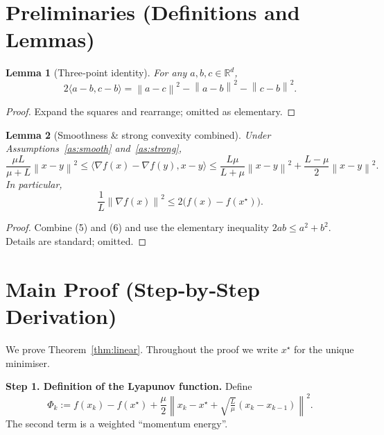 \documentclass{article}
\newtheorem{lemma}{Lemma}
\newcommand{\grad}{\nabla}
\newcommand{\R}{\mathbb{R}}
\newcommand{\norm}[1]{\left\|#1\right\|}
\newcommand{\ip}[2]{\langle #1,#2\rangle}
\begin{document}
\section*{Preliminaries (Definitions and Lemmas)}
\begin{lemma}[Three‑point identity]\label{lem:three}
For any $a,b,c\in\R^{d}$,
\[
2\ip{a-b}{c-b}= \norm{a-c}^{2}-\norm{a-b}^{2}-\norm{c-b}^{2}. \tag{11}
\]
\end{lemma}
\begin{proof}
Expand the squares and rearrange; omitted as elementary. \qedhere
\end{proof}
\begin{lemma}[Smoothness \& strong convexity combined]\label{lem:sc-smooth}
Under Assumptions~\ref{as:smooth} and~\ref{as:strong},
\[
\frac{\mu L}{\mu+L}\norm{x-y}^{2}\le
\ip{\grad f(x)-\grad f(y)}{x-y}\le
\frac{L\mu}{L+\mu}\norm{x-y}^{2}+\frac{L-\mu}{2}\norm{x-y}^{2}. \tag{12}
\]
In particular,
\[
\frac{1}{L}\norm{\grad f(x)}^{2}\le 2\bigl(f(x)-f(x^{\star})\bigr). \tag{13}
\]
\end{lemma}
\begin{proof}
Combine (5) and (6) and use the elementary inequality
$2ab\le a^{2}+b^{2}$.  Details are standard; omitted. \qedhere
\end{proof}
\section*{Main Proof (Step‑by‑Step Derivation)}
We prove Theorem~\ref{thm:linear}.  Throughout the proof we write $x^{\star}$ for the unique minimiser.

\noindent\textbf{Step 1. Definition of the Lyapunov function.}  
Define
\[
\Phi_{k}:=f(x_{k})-f(x^{\star})+\frac{\mu}{2}\norm{x_{k}-x^{\star}+\sqrt{\tfrac{L}{\mu}}(x_{k}-x_{k-1})}^{2}. \tag{14}
\]
The second term is a weighted ``momentum energy''.  
\end{document}
